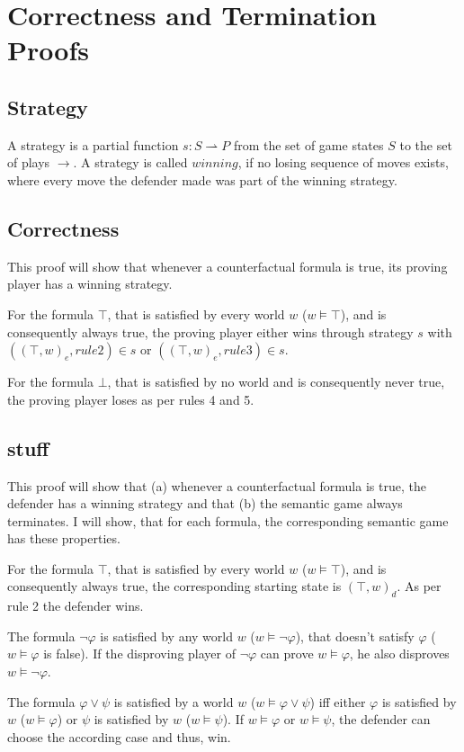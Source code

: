 \documentclass[a4paper,american]{paper}
\begin{document}
\section*{Correctness and Termination Proofs}
\subsection{Strategy}
A strategy is a partial function $s: S\rightharpoonup P$ from the set of game states $S$ to the set of plays $\rightarrow$.
A strategy is called $winning$, if no losing sequence of moves exists, where every move the defender made was part of the winning strategy.
\subsection{Correctness}
This proof will show that whenever a counterfactual formula is true, its proving player has a winning strategy.

For the formula $\top$, that is satisfied by every world $w$ ($w\vDash\top$), and is consequently always true, the proving player either wins through strategy $s$ with $((\top, w)_e, rule 2)\in s$ or $((\top, w)_e, rule 3)\in s$.

For the formula $\bot$, that is satisfied by no world and is consequently never true, the proving player loses as per rules 4 and 5.

\subsection{stuff}
This proof will show that (a) whenever a counterfactual formula is true, the defender has a winning strategy and that (b) the semantic game always terminates. I will show, that for each formula, the corresponding semantic game has these properties.

For the formula $\top$, that is satisfied by every world $w$ ($w\vDash\top$), and is consequently always true, the corresponding starting state is $(\top , w)_d$. As per rule 2 the defender wins.

The formula $\neg\varphi$ is satisfied by any world $w$ ($w\vDash\neg\varphi$), that doesn't satisfy $\varphi$ ($w\vDash\varphi$ is false). If the disproving player of $\neg\varphi$ can prove $w\vDash\varphi$, he also disproves $w\vDash\neg\varphi$.

The formula $\varphi\vee\psi$ is satisfied by a world $w$ ($w\vDash\varphi\vee\psi$) iff either $\varphi$ is satisfied by $w$ ($w\vDash\varphi$) or $\psi$ is satisfied by $w$ ($w\vDash\psi$). If $w\vDash\varphi$ or $w\vDash\psi$, the defender can choose the according case and thus, win.
\end{document}
